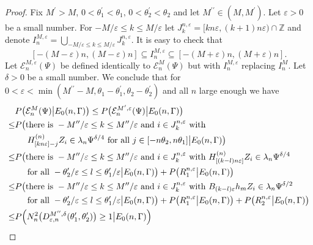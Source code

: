 \documentclass[11pt,reqno]{amsart}
\numberwithin{equation}{section}
\theoremstyle{definition}
\theoremstyle{remark}
\theoremstyle{definition}
\newcommand{\eps}{\varepsilon}
\newcommand{\cE}{\mathcal{E}}
\newcommand{\ZZ}{\mathbb{Z}}
\begin{document}
\begin{proof}
Fix   $M^\prime >M$, $   0<\theta_1^\prime<\theta_1, \,
0<\theta_2^\prime<\theta_2$ and let 
$M^{\prime\prime}\in (M,M^\prime)$. 
Let $\eps>0$ be a small number. For $-M/\eps\leq k\leq M/\eps$ let $J_k^{n, \eps} =
        [kn\eps, (k+1) n\eps) \cap \ZZ$ and denote $I_n^{M,\eps} =
        \bigcup_{-M/\eps\leq k\leq M/\eps} J_k^{n, \eps} $.  It is
        easy to check that
$$
[-(M-\eps)n,(M-\eps)n]\subseteq        I_n^{M,\eps} \subseteq
[-(M+\eps)n,(M+\eps)n].
$$
Let $\cE_n^{M,\eps}(\Psi)$ be defined identically to $\cE_n^M(\Psi)$
but with  $I_n^{M,\eps}$ replacing $I_n^M$. Let $\delta>0$ be a small
number. We conclude that for $0<\eps<\min(M^{\prime\prime} -M,
\theta_1-\theta_1^\prime, \theta_2-\theta_2^\prime)$ 
and all $n$ large
enough we have
\begin{align*}
 &P\bigl(\cE_n^M(\Psi) \big|E_0(n,\Gamma)\bigr) \leq 
  P\bigl(\cE_n^{M^\prime,\eps}(\Psi) \big|E_0(n,\Gamma)\bigr) \\
  \leq &P\bigl( \text{there is} \ -M^{\prime\prime}/\eps \leq k\leq
                    M^{\prime\prime}/\eps \ \text{and} \ i\in J_k^{n,
   \eps} \ \text{with}  \\
                  & \hskip 0.2in H^{(n)}_{[kn\eps]-j} Z_i\in \lambda_n \Psi^{\delta/4} \
                   \text{for all} \  j\in [-n\theta_2,n\theta_1] \big|E_0(n,\Gamma)\bigr)\\
\leq &P\bigl( \text{there is} \ -M^{\prime\prime}/\eps \leq k\leq
                    M^{\prime\prime}/\eps \ \text{and} \ i\in J_k^{n,
   \eps} \ \text{with}  \ H^{(n)}_{[(k-l)n\eps]} Z_i\in \lambda_n \Psi^{\delta/4} \\
                  & \hskip 0.2in 
                   \text{for all} \   -\theta_2^\prime/\eps\leq l\leq \theta_1^\prime/\eps \big|E_0(n,\Gamma)\bigr)
                    + P\bigl( R_1^{n, \eps}\big|E_0(n,\Gamma)\bigr)\\
\leq &P\bigl( \text{there is} \ -M^{\prime\prime}/\eps \leq k\leq
                    M^{\prime\prime}/\eps \ \text{and} \ i\in J_k^{n,
   \eps} \ \text{with}  \ B_{(k-l)\eps}h_m Z_i\in \lambda_n \Psi^{\delta/2} \\
                  & \hskip 0.2in  
                   \text{for all} \   -\theta_2^\prime/\eps\leq l\leq \theta_1^\prime/\eps \big|E_0(n,\Gamma)\bigr)
                    + P\bigl( R_1^{n,
                    \eps}\big|E_0(n,\Gamma)\bigr)+P\bigl( R_2^{n,
                    \eps}\big|E_0(n,\Gamma)\bigr) \\
\leq &P\Bigl( N_n^2\bigl(D_{\eps,n}^{M^{\prime\prime},\delta}(\theta_1^\prime,\theta_2^\prime)\bigr)\geq 1\big| E_0(n,\Gamma)\Bigr)

\end{align*}
\end{proof}
\end{document}
